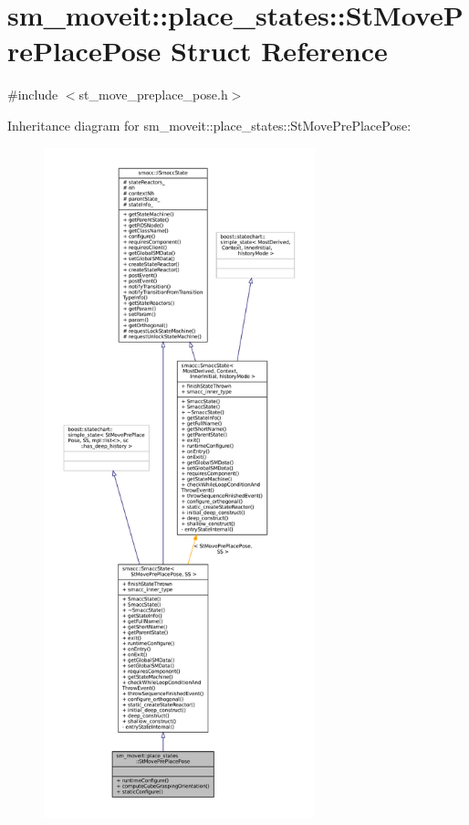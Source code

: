 \hypertarget{structsm__moveit_1_1place__states_1_1StMovePrePlacePose}{}\section{sm\+\_\+moveit\+:\+:place\+\_\+states\+:\+:St\+Move\+Pre\+Place\+Pose Struct Reference}
\label{structsm__moveit_1_1place__states_1_1StMovePrePlacePose}


{\ttfamily \#include $<$st\+\_\+move\+\_\+preplace\+\_\+pose.\+h$>$}



Inheritance diagram for sm\+\_\+moveit\+:\+:place\+\_\+states\+:\+:St\+Move\+Pre\+Place\+Pose\+:
\nopagebreak
\begin{figure}[H]
\begin{center}
\leavevmode
\includegraphics[height=550pt]{structsm__moveit_1_1place__states_1_1StMovePrePlacePose__inherit__graph}
\end{center}
\end{figure}


